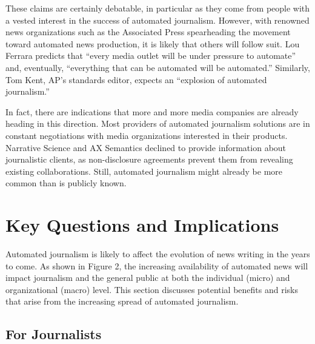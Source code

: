 \documentclass[notoc, symmetric, nobib, nols]{towcenter-guideto-book}
\begin{document}
These claims are certainly debatable, in particular as they come from people with a vested interest in the success of automated journalism. However, with renowned news organizations such as the Associated Press spearheading the movement toward automated news production, it is likely that others will follow suit. Lou Ferrara predicts that ``every media outlet will be under pressure to automate'' and, eventually, ``everything that can be automated will be automated.'' Similarly, Tom Kent, AP's standards editor, expects an ``explosion of automated journalism.''

In fact, there are indications that more and more media companies are already heading in this direction. Most providers of automated journalism solutions are in constant negotiations with media organizations interested in their products. Narrative Science and AX Semantics declined to provide information about journalistic clients, as non-disclosure agreements prevent them from revealing existing collaborations.\autocite{doerr15} Still, automated journalism might already be more common than is publicly known.
 
\chapter{Key Questions and Implications}

Automated journalism is likely to affect the evolution of news writing in the years to come. As shown in Figure 2, the increasing availability of automated news will impact journalism and the general public at both the individual (micro) and organizational (macro) level. This section discusses potential benefits and risks that arise from the increasing spread of automated journalism.

\section{For Journalists}
\end{document}
